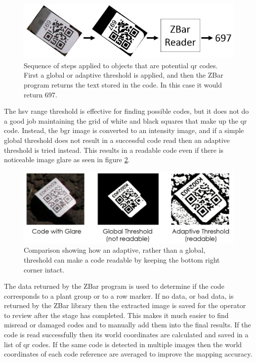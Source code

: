 \begin{figure}
	\centering
    \includegraphics[width=6in]{figures/code_extraction_step2.jpg}
    \caption[Extracted code threshold]{Sequence of steps applied to objects that are potential \ac{qr} codes.  First a global or adaptive threshold is applied, and then the ZBar program returns the text stored in the code. In this case it would return 697.}
    \label{figure:code_extraction2}
\end{figure} 

The \ac{hsv} range threshold is effective for finding possible codes, but it does not do a good job maintaining the grid of white and black squares that make up the \ac{qr} code.  Instead, the \ac{bgr} image is converted to an intensity image, and if a simple global threshold does not result in a successful code read then an adaptive threshold is tried instead.  This results in a readable code even if there is noticeable image glare as seen in figure \ref{figure:adaptive_threshold}. 

\begin{figure}
	\centering
    \includegraphics[width=5.5in]{figures/adaptive_threshold.jpg}
    \caption[Adaptive threshold]{Comparison showing how an adaptive, rather than a global, threshold can make a code readable by keeping the bottom right corner intact.}
    \label{figure:adaptive_threshold}
\end{figure} 

The data returned by the ZBar program is used to determine if the code corresponds to a plant group or to a row marker.  If no data, or bad data, is returned by the ZBar library then the extracted image is saved for the operator to review after the stage has completed.  This makes it much easier to find misread or damaged codes and to manually add them into the final results.  If the code is read successfully then its world coordinates are calculated and saved in a list of \ac{qr} codes.   If the same code is detected in multiple images then the world coordinates of each code reference are averaged to improve the mapping accuracy.

